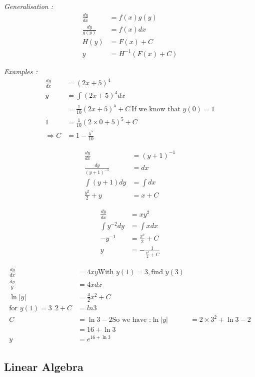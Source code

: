 \documentclass{article}
\begin{document}
    \textit{Generalisation :}
    \begin{align*}
        \frac{dy}{dx} &= f(x)g(y)\\
        \frac{dy}{g(y)} &= f(x)dx\\
        H(y) &= F(x) +C \\
        y &= H^{-1}(F(x)+C)
    \end{align*}

    \textit{Examples :}
    \begin{align*}
        \frac{dy}{dx} &= (2x+5)^4\\
        y &= \int (2x+5)^4 dx\\
        &= \frac{1}{10}(2x+5)^5 +C ~ \text{If we know that }y(0)=1\\
        1 &= \frac{1}{10}(2\times 0 + 5)^5 +C \\
        \Rightarrow C &= 1-\frac{5^5}{10}
    \end{align*}

    \begin{align*}
        \frac{dy}{dx}&=(y+1)^{-1}\\
        \frac{dy}{(y+1)^{-1}} &= dx\\
        \int (y+1)dy &= \int dx\\
         \frac{y^2}{2}+y &= x + C
    \end{align*}

    \begin{align*}
        \frac{dy}{dx} &= xy^2\\
        \int y^{-2}dy &= \int xdx\\
        -y^{-1} &= \frac{x^2}{2} +C\\
        y &= - \frac{1}{\frac{x^2}{2}+C}
    \end{align*}

    \begin{align*}
        \frac{dy}{dx} &= 4xy \text{With }y(1)=3, \text{find } y(3)\\
        \frac{dy}{y} &= 4x dx\\
        \ln |y| &= \frac{4}{2}x^2 +C\\
        \text{for }y(1)=3 ~~ 2+C &= ln 3 \\
        C &= \ln 3 -2
        \text{So we have :} \ln |y| &= 2 \times 3^2 + \ln 3 -2\\
        &= 16 + \ln 3\\
        y &= e^{16 + \ln 3}
    \end{align*}



    \subsection{Linear Algebra}
\end{document}
